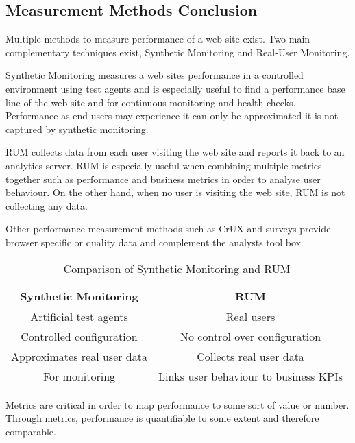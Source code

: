 


\subsection{Measurement Methods Conclusion}


Multiple methods to measure performance of a web site exist.
Two main complementary techniques exist, Synthetic Monitoring and Real-User Monitoring.

Synthetic Monitoring measures a web sites performance in a controlled environment using test agents and is especially useful to find a performance base line of the web site and for continuous monitoring and health checks.
Performance as end users may experience it can only be approximated it is not captured by synthetic monitoring.

RUM collects data from each user visiting the web site and reports it back to an analytics server.
RUM is especially useful when combining multiple metrics together such as performance and business metrics in order to analyse user behaviour.
On the other hand, when no user is visiting the web site, RUM is not collecting any data.

Other performance measurement methods such as CrUX and surveys provide browser specific or quality data and complement the analysts tool box.

\begin{table}[h]
	\small
	\centering
	\begin{tabular}{ | c | c | }
	\hline
	Synthetic Monitoring \cellcolor{lightgrey} & RUM \cellcolor{lightgrey} \\
	\hline
	Artificial test agents & Real users \\
	\hline
	Controlled configuration & No control over configuration \\
	\hline
	Approximates real user data & Collects real user data \\
	\hline
	For monitoring & Links user behaviour to business KPIs \\
	\hline
	\end{tabular}
	\medskip
	\caption{Comparison of Synthetic Monitoring and RUM}
	\label{table:synthetic_monitoring_rum_comparison} %
\end{table}


Metrics are critical in order to map performance to some sort of value or number.
Through metrics, performance is quantifiable to some extent and therefore comparable.

